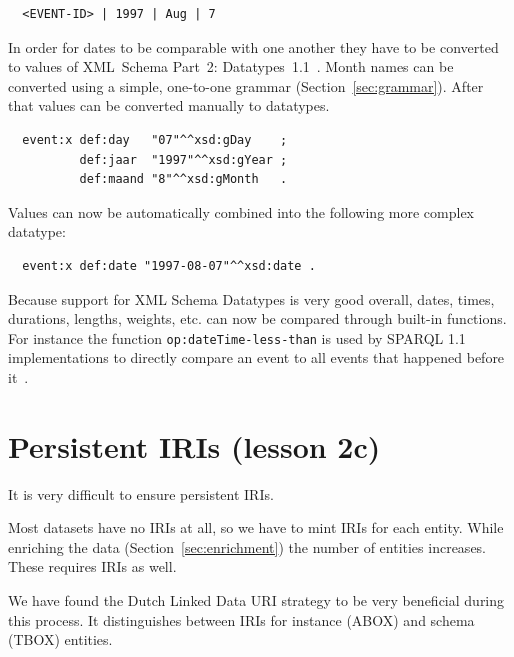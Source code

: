 \documentclass[a4paper]{scrartcl}
\newcommand{\textt}[1]{{\small \texttt{#1}}}
\begin{document}
\begin{verbatim}
  <EVENT-ID> | 1997 | Aug | 7
\end{verbatim}

In order for dates to be comparable with one another they have to be
converted to values of XML~Schema Part~2:
Datatypes~1.1~\cite{Peterson2012}.  Month names can be converted using
a simple, one-to-one grammar (Section~\ref{sec:grammar}).  After that
values can be converted manually to datatypes.

\begin{verbatim}
  event:x def:day   "07"^^xsd:gDay    ;
          def:jaar  "1997"^^xsd:gYear ;
          def:maand "8"^^xsd:gMonth   .
\end{verbatim}

Values can now be automatically combined into the following more
complex datatype:

\begin{verbatim}
  event:x def:date "1997-08-07"^^xsd:date .
\end{verbatim}

Because support for XML Schema Datatypes is very good overall, dates,
times, durations, lengths, weights, etc. can now be compared through
built-in functions.  For instance the function
\textt{op:dateTime-less-than} is used by SPARQL 1.1 implementations to
directly compare an event to all events that happened before
it~\cite{Malhotra2015}.



\section{Persistent IRIs (lesson 2c)}

It is very difficult to ensure persistent IRIs.

Most datasets have no IRIs at all, so we have to mint IRIs for each
entity.  While enriching the data (Section~\ref{sec:enrichment}) the
number of entities increases.  These requires IRIs as well.

We have found the Dutch Linked Data URI strategy to be very beneficial
during this process.  It distinguishes between IRIs for instance
(ABOX) and schema (TBOX) entities.
\end{document}
